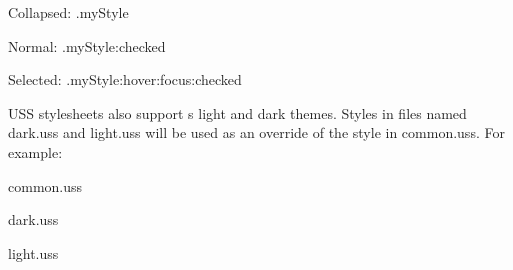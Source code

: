 \begin{DoxyItemize}
\item Collapsed\+: {\ttfamily .my\+Style}
\item Normal\+: {\ttfamily .my\+Style\+:checked}
\item Selected\+: {\ttfamily .my\+Style\+:hover\+:focus\+:checked}
\end{DoxyItemize}

USS stylesheets also support \textquotesingle{}s light and dark themes. Styles in files named {\ttfamily dark.\+uss} and {\ttfamily light.\+uss} will be used as an override of the style in {\ttfamily common.\+uss}. For example\+:


\begin{DoxyItemize}
\item {\ttfamily common.\+uss}
\end{DoxyItemize}


\begin{DoxyCode}{0}
\DoxyCodeLine{\{}
\DoxyCodeLine{\}}

\end{DoxyCode}



\begin{DoxyItemize}
\item {\ttfamily dark.\+uss}
\end{DoxyItemize}


\begin{DoxyCode}{0}
\DoxyCodeLine{\{}
\DoxyCodeLine{\}}

\end{DoxyCode}



\begin{DoxyItemize}
\item {\ttfamily light.\+uss}
\end{DoxyItemize}


\begin{DoxyCode}{0}
\DoxyCodeLine{\{}
\DoxyCodeLine{\}}

\end{DoxyCode}



